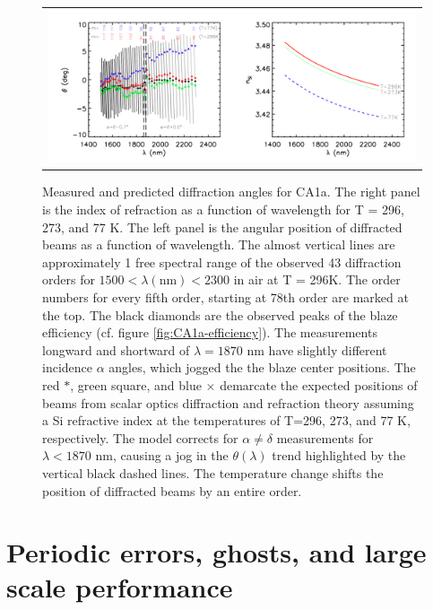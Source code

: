 \begin{figure}
\begin{center}
 \begin{tabular}{c}
    \includegraphics[width=1.0\textwidth]{chSPIE_2012_CA1/figs/CA1a_diffrac}
   \end{tabular}
  \end{center}
  \caption[CA1a Diffraction]{\label{fig:CA1a-diffrac} Measured and predicted diffraction angles for CA1a.  The right panel is the index of refraction as a function of wavelength\cite{frey2006} for T = 296, 273, and 77 K.  The left panel is the angular position of diffracted beams as a function of wavelength.  The almost vertical lines are approximately 1 free spectral range of the observed 43 diffraction orders for $1500 < \lambda (\textrm{nm}) < 2300$ in air at T = 296K.  The order numbers for every fifth order, starting at 78th order are marked at the top.  The black diamonds are the observed peaks of the blaze efficiency (cf. figure \ref{fig:CA1a-efficiency}).  The measurements longward and shortward of $\lambda=1870$ nm have slightly different incidence $\alpha$ angles, which jogged the the blaze center positions.  The red $\ast$, green square, and blue $\times$ demarcate the expected positions of beams from scalar optics diffraction and refraction theory assuming a Si refractive index at the temperatures of T=296, 273, and 77 K, respectively.  The model corrects for $\alpha \neq \delta$ measurements for $\lambda < 1870 $ nm, causing a jog in the $\theta(\lambda)$ trend highlighted by the vertical black dashed lines.  The temperature change shifts the position of diffracted beams by an entire order.}
\end{figure}

\section{Periodic errors, ghosts, and large scale performance} 

